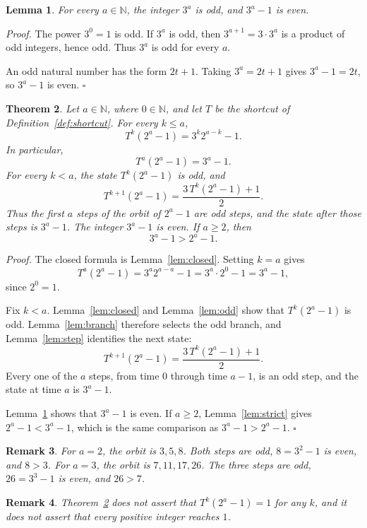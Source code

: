 \documentclass[11pt,letterpaper]{article}
\newcommand{\N}{\mathbb{N}}
\newtheorem{theorem}{Theorem}
\newtheorem{lemma}[theorem]{Lemma}
\newtheorem{remark}[theorem]{Remark}
\newenvironment{proof}{\noindent\textit{Proof.}}{\hfill\(\square\)}
\begin{document}
\begin{lemma}
\label{lem:even}
For every \(a\in\N\), the integer \(3^{a}\) is odd, and \(3^{a}-1\) is even.
\end{lemma}

\begin{proof}
The power \(3^{0}=1\) is odd. If \(3^{a}\) is odd, then \(3^{a+1}=3\cdot 3^{a}\) is a product of odd integers, hence odd. Thus \(3^{a}\) is odd for every \(a\).

An odd natural number has the form \(2t+1\). Taking \(3^{a}=2t+1\) gives \(3^{a}-1=2t\), so \(3^{a}-1\) is even.
\end{proof}

\begin{theorem}
\label{thm:burst-growth}
Let \(a\in\N\), where \(0\in\N\), and let \(T\) be the shortcut of Definition~\ref{def:shortcut}. For every \(k\le a\),
\[
T^{k}(2^{a}-1)=3^{k}2^{a-k}-1.
\]
In particular,
\[
T^{a}(2^{a}-1)=3^{a}-1.
\]
For every \(k<a\), the state \(T^{k}(2^{a}-1)\) is odd, and
\[
T^{k+1}(2^{a}-1)=\frac{3\,T^{k}(2^{a}-1)+1}{2}.
\]
Thus the first \(a\) steps of the orbit of \(2^{a}-1\) are odd steps, and the state after those steps is \(3^{a}-1\). The integer \(3^{a}-1\) is even. If \(a\ge 2\), then
\[
3^{a}-1>2^{a}-1.
\]
\end{theorem}

\begin{proof}
The closed formula is Lemma~\ref{lem:closed}. Setting \(k=a\) gives
\[
T^{a}(2^{a}-1)=3^{a}2^{a-a}-1=3^{a}\cdot 2^{0}-1=3^{a}-1,
\]
since \(2^{0}=1\).

Fix \(k<a\). Lemma~\ref{lem:closed} and Lemma~\ref{lem:odd} show that \(T^{k}(2^{a}-1)\) is odd. Lemma~\ref{lem:branch} therefore selects the odd branch, and Lemma~\ref{lem:step} identifies the next state:
\[
T^{k+1}(2^{a}-1)=\frac{3\,T^{k}(2^{a}-1)+1}{2}.
\]
Every one of the \(a\) steps, from time \(0\) through time \(a-1\), is an odd step, and the state at time \(a\) is \(3^{a}-1\).

Lemma~\ref{lem:even} shows that \(3^{a}-1\) is even. If \(a\ge 2\), Lemma~\ref{lem:strict} gives \(2^{a}-1<3^{a}-1\), which is the same comparison as \(3^{a}-1>2^{a}-1\).
\end{proof}

\begin{remark}
\label{rem:examples}
For \(a=2\), the orbit is \(3,5,8\). Both steps are odd, \(8=3^{2}-1\) is even, and \(8>3\). For \(a=3\), the orbit is \(7,11,17,26\). The three steps are odd, \(26=3^{3}-1\) is even, and \(26>7\).
\end{remark}

\begin{remark}
\label{rem:not-one}
Theorem~\ref{thm:burst-growth} does not assert that \(T^{k}(2^{a}-1)=1\) for any \(k\), and it does not assert that every positive integer reaches \(1\).
\end{remark}
\end{document}
